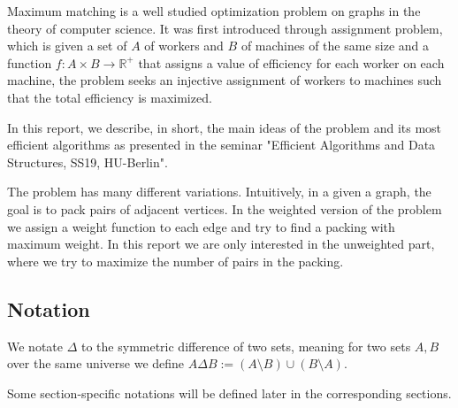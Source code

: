 Maximum matching is a well studied optimization problem on graphs in the theory of computer science. It was first introduced through assignment problem, which is given a set of $A$ of workers and $B$ of machines of the same size and a function $f:A\times B \rightarrow \mathbb{R}^{+}$ that assigns a value of efficiency for each worker on each machine, the problem seeks an injective assignment of workers to machines such that the total efficiency is maximized.

In this report, we describe, in short, the main ideas of the problem and its most efficient algorithms as presented in the seminar "Efficient Algorithms and Data Structures, SS19, HU-Berlin".

The problem has many different variations. Intuitively, in a given a graph, the goal is to pack pairs of adjacent vertices. In the weighted version of the problem we assign a weight function to each edge and try to find a packing with maximum weight. In this report we are only interested in the unweighted part, where we try to maximize the number of pairs in the packing.

\subsection{Notation}
We notate $\Delta$  to the symmetric difference of two sets, meaning for two sets $A, B$ over the same universe we define $A\Delta B := \left( A \setminus B \right) \cup \left( B \setminus A \right)$.

Some section-specific notations will be defined later in the corresponding sections.
